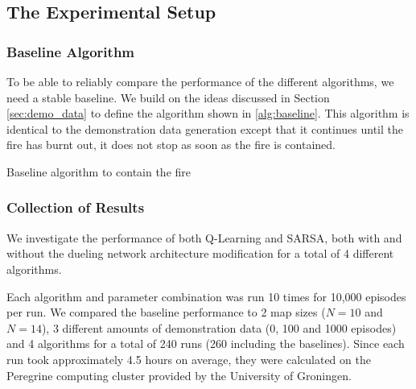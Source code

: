 \subsection{The Experimental Setup}\label{sec:experiment}

\subsubsection{Baseline Algorithm}\label{sec:baseline}
To be able to reliably compare the performance of the different algorithms, we need a stable baseline. We build on the ideas discussed in Section \ref{sec:demo_data} to define the algorithm shown in \ref{alg:baseline}. This algorithm is identical to the demonstration data generation except that it continues until the fire has burnt out, it does not stop as soon as the fire is contained.

\begin{algorithm}
  \caption{Baseline algorithm to contain the fire}
  \label{alg:baseline}
  \begin{algorithmic}[1]
    \EndIf
    \EndWhile
    \State {}
    \EndProcedure
  \end{algorithmic}
\end{algorithm}

\subsubsection{Collection of Results}\label{sec:datacollection}
We investigate the performance of both Q-Learning and SARSA, both with and without the dueling network architecture modification for a total of 4 different algorithms.

Each algorithm and parameter combination was run 10 times for 10,000 episodes per run. We compared the baseline performance to 2 map sizes ($N=10$ and $N=14$), 3 different amounts of demonstration data (0, 100 and 1000 episodes) and 4 algorithms for a total of 240 runs (260 including the baselines). Since each run took approximately 4.5 hours on average, they were calculated on the Peregrine computing cluster provided by the University of Groningen.
